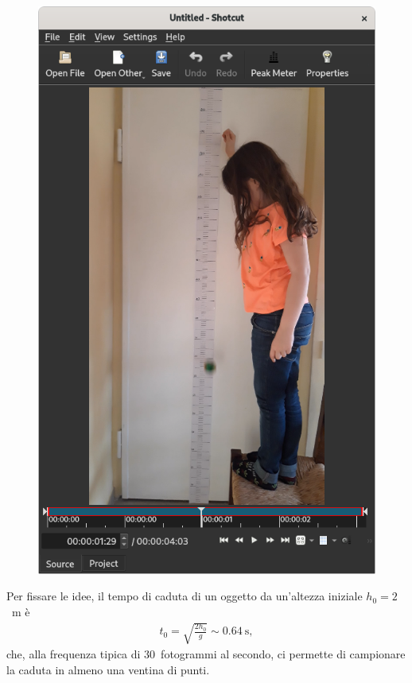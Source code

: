 \documentclass{lab1-article}
\begin{document}
\begin{article}
\begin{figure}[!htb]
  \includegraphics[width=\linewidth]{figures/caduta}
\end{figure}


Per fissare le idee, il tempo di caduta di un oggetto da un'altezza iniziale
$h_0 = 2$~m \`e
\begin{align*}
  t_0 = \sqrt{\frac{2h_0}{g}} \sim 0.64~\text{s},
\end{align*}
che, alla frequenza tipica di $30$~fotogrammi al secondo, ci permette di
campionare la caduta in almeno una ventina di punti.



\end{article}
\end{document}
